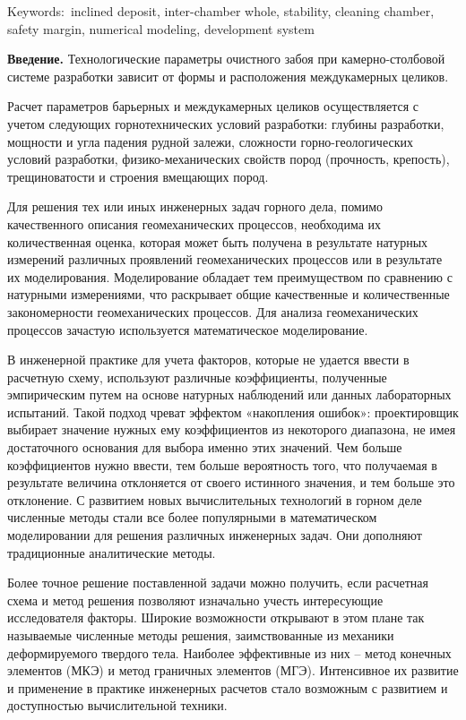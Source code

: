 Keywords:~inclined deposit, inter-chamber whole, stability, cleaning
chamber, safety margin, numerical modeling, development system

\begin{multicols}{2}
{\bfseries Введение.} Технологические параметры очистного забоя при
камерно-столбовой системе разработки зависит от формы и расположения
междукамерных целиков.

Расчет параметров барьерных и междукамерных целиков осуществляется с
учетом следующих горнотехнических условий разработки: глубины
разработки, мощности и угла падения рудной залежи, сложности
горно-геологических условий разработки, физико-механических свойств
пород (прочность, крепость), трещиноватости и строения вмещающих пород.

Для решения тех или иных инженерных задач горного дела, помимо
качественного описания геомеханических процессов, необходима их
количественная оценка, которая может быть получена в результате натурных
измерений различных проявлений геомеханических процессов или в
результате их моделирования. Моделирование обладает тем преимуществом по
сравнению с натурными измерениями, что раскрывает общие качественные и
количественные закономерности геомеханических процессов. Для анализа
геомеханических процессов зачастую используется математическое
моделирование.

В инженерной практике для учета факторов, которые не удается ввести в
расчетную схему, используют различные коэффициенты, полученные
эмпирическим путем на основе натурных наблюдений или данных лабораторных
испытаний. Такой подход чреват эффектом «накопления ошибок»:
проектировщик выбирает значение нужных ему коэффициентов из некоторого
диапазона, не имея достаточного основания для выбора именно этих
значений. Чем больше коэффициентов нужно ввести, тем больше вероятность
того, что получаемая в результате величина отклоняется от своего
истинного значения, и тем больше это отклонение. С развитием новых
вычислительных технологий в горном деле численные методы стали все более
популярными в математическом моделировании для решения различных
инженерных задач. Они дополняют традиционные аналитические методы.

Более точное решение поставленной задачи можно получить, если расчетная
схема и метод решения позволяют изначально учесть интересующие
исследователя факторы. Широкие возможности открывают в этом плане так
называемые численные методы решения, заимствованные из механики
деформируемого твердого тела. Наиболее эффективные из них -- метод
конечных элементов (МКЭ) и метод граничных элементов (МГЭ). Интенсивное
их развитие и применение в практике инженерных расчетов стало возможным
с развитием и доступностью вычислительной техники.


\end{multicols}
